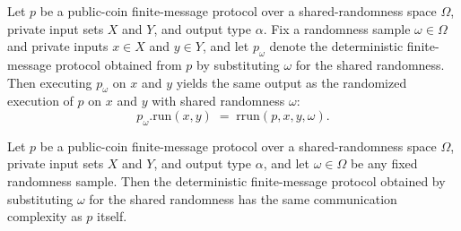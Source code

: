\begin{theorem}
\label{CommunicationComplexity.PublicCoin.FiniteMessage.Protocol.toDeterministic_run}
\leanok
{}
Let $p$ be a public-coin finite-message protocol over a shared-randomness space
$\Omega$, private input sets $X$ and $Y$, and output type $\alpha$. Fix a randomness
sample $\omega \in \Omega$ and private inputs $x \in X$ and $y \in Y$, and let
$p_\omega$ denote the deterministic finite-message protocol obtained from $p$ by
substituting $\omega$ for the shared randomness. Then executing $p_\omega$ on $x$ and
$y$ yields the same output as the randomized execution of $p$ on $x$ and $y$ with shared
randomness $\omega$:
\[
p_\omega.\mathrm{run}(x, y) \;=\; \mathrm{rrun}(p, x, y, \omega).
\]
\end{theorem}

\begin{theorem}
\label{CommunicationComplexity.PublicCoin.FiniteMessage.Protocol.toDeterministic_complexity}
\leanok
{}
Let $p$ be a public-coin finite-message protocol over a shared-randomness space
$\Omega$, private input sets $X$ and $Y$, and output type $\alpha$, and let $\omega \in
\Omega$ be any fixed randomness sample. Then the deterministic finite-message protocol
obtained by substituting $\omega$ for the shared randomness has the same communication
complexity as $p$ itself.
\end{theorem}


